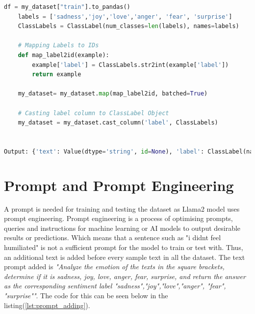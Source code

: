 \lstset{style=mystyle}
\begin{lstlisting}[language=Python, caption=The code for adding \emph{ClassLabel} and its results, label=lst:classlabel]
    df = my_dataset["train"].to_pandas()
    labels = ['sadness','joy','love','anger', 'fear', 'surprise']
    ClassLabels = ClassLabel(num_classes=len(labels), names=labels)
    
    # Mapping Labels to IDs
    def map_label2id(example):
        example['label'] = ClassLabels.str2int(example['label'])
        return example
    
    my_dataset= my_dataset.map(map_label2id, batched=True)
    
    # Casting label column to ClassLabel Object
    my_dataset = my_dataset.cast_column('label', ClassLabels)


Output: {'text': Value(dtype='string', id=None), 'label': ClassLabel(names=['sadness', 'joy', 'love', 'anger', 'fear', 'surprise'], id=None)}
\end{lstlisting}

\section{Prompt and Prompt Engineering}

A prompt is needed for training and testing the dataset as Llama2 model uses prompt engineering. Prompt engineering is a process of optimising prompts, queries and instructions for machine learning or AI models to output desirable results or predictions\cite{McKinsey_2024}. Which means that a sentence such as "i didnt feel humiliated" is not a sufficient prompt for the model to train or test with. Thus, an additional text is added before every sample text in all the dataset. The text prompt added is \textit{"Analyze the emotion of the texts in the square brackets, determine if it is sadness, joy, love, anger, fear, surprise, and return the answer as the corresponding sentiment label "sadness","joy","love","anger", "fear", "surprise""}. The code for this can be seen below in the listing(\ref{lst:prompt_adding}).

